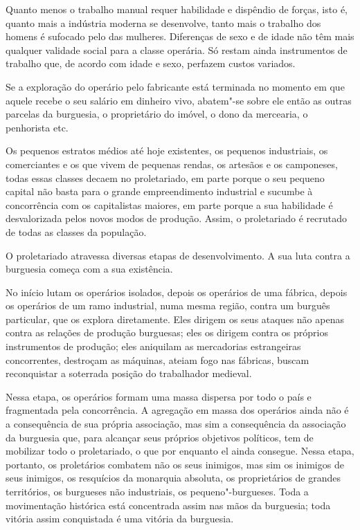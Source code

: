 Quanto menos o trabalho manual requer habilidade e dispêndio de forças,
isto é, quanto mais a indústria moderna se desenvolve, tanto mais o
trabalho dos homens é sufocado pelo das mulheres. Diferenças de sexo e
de idade não têm mais qualquer validade social para a classe operária.
Só restam ainda instrumentos de trabalho que, de acordo com idade e
sexo, perfazem custos variados.

Se a exploração do operário pelo fabricante está terminada no momento em
que aquele recebe o seu salário em dinheiro vivo, abatem"-se sobre ele
então as outras parcelas da burguesia, o proprietário do imóvel, o dono
da mercearia, o penhorista etc.

Os pequenos estratos médios até hoje existentes, os pequenos
industriais, os comerciantes e os que vivem de pequenas rendas, os
artesãos e os camponeses, todas essas classes decaem no proletariado,
em parte porque o seu pequeno capital não basta para o grande
empreendimento industrial e sucumbe à concorrência com os capitalistas
maiores, em parte porque a sua habilidade é desvalorizada pelos novos
modos de produção. Assim, o proletariado é recrutado de todas as classes
da população.

O proletariado atravessa diversas etapas de desenvolvimento. A sua luta
contra a burguesia começa com a sua existência.

No início lutam os operários isolados, depois os operários de uma   \label{6}
fábrica, depois os operários de um ramo industrial, numa mesma região,
contra um burguês particular, que os explora diretamente. Eles dirigem
os seus ataques não apenas contra as relações de produção burguesas;
eles os dirigem contra os próprios instrumentos de produção; eles
aniquilam as mercadorias estrangeiras concorrentes, destroçam as
máquinas, ateiam fogo nas fábricas, buscam reconquistar a soterrada
posição do trabalhador medieval.

Nessa etapa, os operários formam uma massa dispersa por todo o país e
fragmentada pela concorrência. A agregação em massa dos operários ainda
não é a consequência de sua própria associação, mas sim a consequência
da associação da burguesia que, para alcançar seus próprios objetivos
políticos, tem de mobilizar todo o proletariado, o que por enquanto el
ainda consegue. Nessa etapa, portanto, os proletários combatem não os
seus inimigos, mas sim os inimigos de seus inimigos, os resquícios da
monarquia absoluta, os proprietários de grandes territórios, os
burgueses não industriais, os pequeno"-burgueses. Toda a movimentação
histórica está concentrada assim nas mãos da burguesia; toda vitória
assim conquistada é uma vitória da burguesia.

